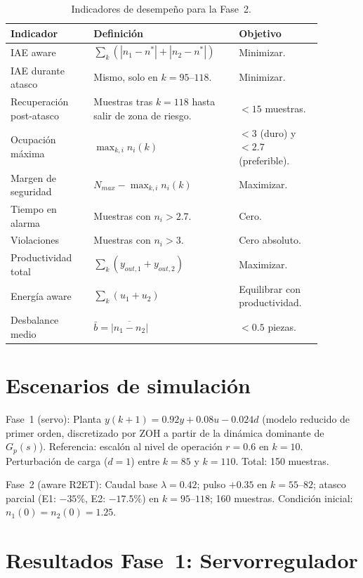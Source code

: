 \begin{table}[H]
\centering
\caption{Indicadores de desempeño para la Fase~2.}
\label{tab:indicadores_aware}
\begin{tabular}{@{}P{0.24\linewidth}P{0.40\linewidth}P{0.24\linewidth}@{}}
\toprule
Indicador & Definición & Objetivo \\ \midrule
IAE aware & $\sum_{k}(|n_1-n^*|+|n_2-n^*|)$ & Minimizar.\\
IAE durante atasco & Mismo, solo en $k=95$--$118$. & Minimizar.\\
Recuperación post-atasco & Muestras tras $k=118$ hasta salir de zona de riesgo. & $<15$ muestras.\\
Ocupación máxima & $\max_{k,i}n_i(k)$ & $< 3$ (duro) y $< 2.7$ (preferible).\\
Margen de seguridad & $N_{max} - \max_{k,i}n_i(k)$ & Maximizar.\\
Tiempo en alarma & Muestras con $n_i > 2.7$. & Cero.\\
Violaciones & Muestras con $n_i > 3$. & Cero absoluto.\\
Productividad total & $\sum_{k}(y_{out,1}+y_{out,2})$ & Maximizar.\\
Energía aware & $\sum_{k}(u_1+u_2)$ & Equilibrar con productividad.\\
Desbalance medio & $\bar{b} = \overline{|n_1-n_2|}$ & $< 0.5$ piezas.\\
\bottomrule
\end{tabular}
\end{table}

\section{Escenarios de simulación}

Fase~1 (servo): Planta $y(k+1)=0.92y+0.08u-0.024d$ (modelo reducido de primer orden, discretizado por ZOH a partir de la dinámica dominante de $G_p(s)$). Referencia: escalón al nivel de operación $r=0.6$ en $k=10$. Perturbación de carga ($d=1$) entre $k=85$ y $k=110$. Total: 150 muestras.

Fase~2 (aware R2ET): Caudal base $\lambda=0.42$; pulso $+0.35$ en $k=55$--$82$; atasco parcial (E1: $-35\%$, E2: $-17.5\%$) en $k=95$--$118$; 160 muestras. Condición inicial: $n_1(0)=n_2(0)=1.25$.

\section{Resultados Fase~1: Servorregulador}

